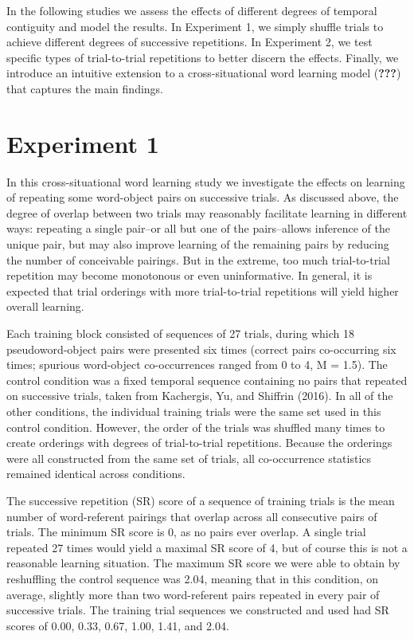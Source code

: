 \documentclass[man,floatsintext]{apa6}
\begin{document}
In the following studies we assess the effects of different degrees of temporal contiguity and model the results. In Experiment 1, we simply shuffle trials to achieve different degrees of successive repetitions.
In Experiment 2, we test specific types of trial-to-trial repetitions to better discern the effects.
Finally, we introduce an intuitive extension to a cross-situational word learning model ({\textbf{???}}) that captures the main findings.

\hypertarget{experiment-1}{%
\section{Experiment 1}\label{experiment-1}}

In this cross-situational word learning study we investigate the effects on learning of repeating some word-object pairs on successive trials.
As discussed above, the degree of overlap between two trials may reasonably facilitate learning in different ways: repeating a single pair--or all but one of the pairs--allows inference of the unique pair, but may also improve learning of the remaining pairs by reducing the number of conceivable pairings.
But in the extreme, too much trial-to-trial repetition may become monotonous or even uninformative.
In general, it is expected that trial orderings with more trial-to-trial repetitions will yield higher overall learning.

Each training block consisted of sequences of 27 trials, during which 18 pseudoword-object pairs were presented six times (correct pairs co-occurring six times; spurious word-object co-occurrences ranged from 0 to 4, M = 1.5).
The control condition was a fixed temporal sequence containing no pairs that repeated on successive trials, taken from Kachergis, Yu, and Shiffrin (2016).
In all of the other conditions, the individual training trials were the same set used in this control condition.
However, the order of the trials was shuffled many times to create orderings with degrees of trial-to-trial repetitions.
Because the orderings were all constructed from the same set of trials, all co-occurrence statistics remained identical across conditions.

The successive repetition (SR) score of a sequence of training trials is the mean number of word-referent pairings that overlap across all consecutive pairs of trials.
The minimum SR score is 0, as no pairs ever overlap.
A single trial repeated 27 times would yield a maximal SR score of 4, but of course this is not a reasonable learning situation.
The maximum SR score we were able to obtain by reshuffling the control sequence was 2.04, meaning that in this condition, on average, slightly more than two word-referent pairs repeated in every pair of successive trials.
The training trial sequences we constructed and used had SR scores of 0.00, 0.33, 0.67, 1.00, 1.41, and 2.04.
\end{document}

